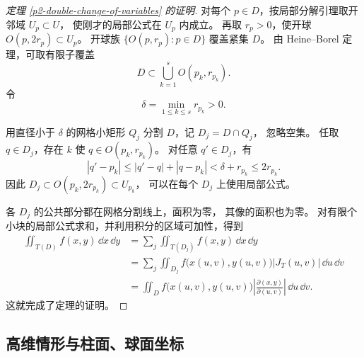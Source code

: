 \begin{proof}[定理 \ref{p2-double-change-of-variables} 的证明]
对每个 $p\in D$，按局部分解引理取开邻域 $U_p\subset U$，
使刚才的局部公式在 $U_p$ 内成立。
再取 $r_p>0$，使开球 $O(p,2r_p)\subset U_p$。
开球族 $\{O(p,r_p):p\in D\}$ 覆盖紧集 $D$。
由 Heine--Borel 定理，可取有限子覆盖
\[
D\subset\bigcup_{k=1}^sO(p_k,r_{p_k}).
\]
令
\[
\delta=\min_{1\le k\le s}r_{p_k}>0.
\]

用直径小于 $\delta$ 的网格小矩形 $Q_j$ 分割 $D$，记 $D_j=D\cap Q_j$，
忽略空集。
任取 $q\in D_j$，存在 $k$ 使 $q\in O(p_k,r_{p_k})$。
对任意 $q'\in D_j$，有
\[
|q'-p_k|\le|q'-q|+|q-p_k|<\delta+r_{p_k}\le2r_{p_k}.
\]
因此 $D_j\subset O(p_k,2r_{p_k})\subset U_{p_k}$，
可以在每个 $D_j$ 上使用局部公式。

各 $D_j$ 的公共部分都在网格分割线上，面积为零，
其像的面积也为零。
对有限个小块的局部公式求和，并利用积分的区域可加性，得到
\begin{align*}
\iint_{T(D)}f(x,y)\,\dd x\,\dd y
&=\sum_j\iint_{T(D_j)}f(x,y)\,\dd x\,\dd y\\
&=\sum_j\iint_{D_j}
 f\bigl(x(u,v),y(u,v)\bigr)|J_T(u,v)|\,\dd u\,\dd v\\
&=\iint_D f\bigl(x(u,v),y(u,v)\bigr)
 \left|\frac{\partial(x,y)}{\partial(u,v)}\right|\,\dd u\,\dd v.
\end{align*}
这就完成了定理的证明。
\end{proof}

\subsection*{高维情形与柱面、球面坐标}

